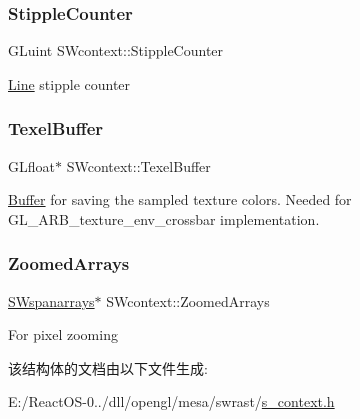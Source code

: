 \subsubsection{\texorpdfstring{Stipple\+Counter}{StippleCounter}}
{\footnotesize\ttfamily G\+Luint S\+Wcontext\+::\+Stipple\+Counter}

\hyperlink{struct_line}{Line} stipple counter \mbox{\label{struct_s_wcontext_acc5960e550aca2f44f43be2b111506d0}} 
\subsubsection{\texorpdfstring{Texel\+Buffer}{TexelBuffer}}
{\footnotesize\ttfamily G\+Lfloat$\ast$ S\+Wcontext\+::\+Texel\+Buffer}

\hyperlink{class_buffer}{Buffer} for saving the sampled texture colors. Needed for G\+L\+\_\+\+A\+R\+B\+\_\+texture\+\_\+env\+\_\+crossbar implementation. \mbox{\label{struct_s_wcontext_a353abb5ab97460323cbc47f335b5d34e}} 
\subsubsection{\texorpdfstring{Zoomed\+Arrays}{ZoomedArrays}}
{\footnotesize\ttfamily \hyperlink{structsw__span__arrays}{S\+Wspanarrays}$\ast$ S\+Wcontext\+::\+Zoomed\+Arrays}

For pixel zooming 

该结构体的文档由以下文件生成\+:\begin{DoxyCompactItemize}
\item 
E\+:/\+React\+O\+S-\/0../dll/opengl/mesa/swrast/\hyperlink{s__context_8h}{s\+\_\+context.\+h}\end{DoxyCompactItemize}
